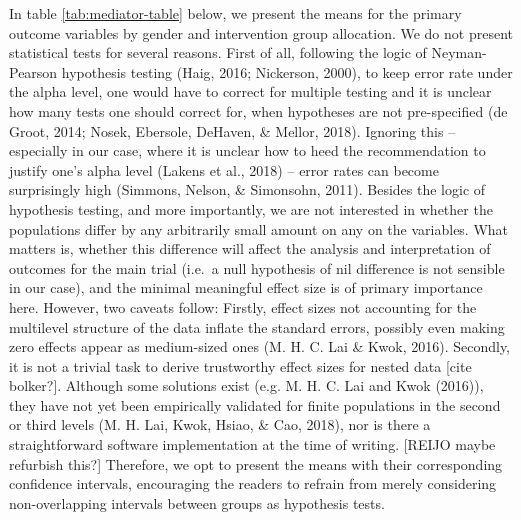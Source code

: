 \documentclass[english,floatsintext,]{apa6}
\theoremstyle{definition}
\theoremstyle{definition}
\theoremstyle{definition}
\theoremstyle{remark}
\begin{document}
In table \ref{tab:mediator-table} below, we present the means for the
primary outcome variables by gender and intervention group allocation.
We do not present statistical tests for several reasons. First of all,
following the logic of Neyman-Pearson hypothesis testing (Haig, 2016;
Nickerson, 2000), to keep error rate under the alpha level, one would
have to correct for multiple testing and it is unclear how many tests
one should correct for, when hypotheses are not pre-specified (de Groot,
2014; Nosek, Ebersole, DeHaven, \& Mellor, 2018). Ignoring this --
especially in our case, where it is unclear how to heed the
recommendation to justify one's alpha level (Lakens et al., 2018) --
error rates can become surprisingly high (Simmons, Nelson, \& Simonsohn,
2011). Besides the logic of hypothesis testing, and more importantly, we
are not interested in whether the populations differ by any arbitrarily
small amount on any on the variables. What matters is, whether this
difference will affect the analysis and interpretation of outcomes for
the main trial (i.e.~a null hypothesis of nil difference is not sensible
in our case), and the minimal meaningful effect size is of primary
importance here. However, two caveats follow: Firstly, effect sizes not
accounting for the multilevel structure of the data inflate the standard
errors, possibly even making zero effects appear as medium-sized ones
(M. H. C. Lai \& Kwok, 2016). Secondly, it is not a trivial task to
derive trustworthy effect sizes for nested data {[}cite bolker?{]}.
Although some solutions exist (e.g. M. H. C. Lai and Kwok (2016)), they
have not yet been empirically validated for finite populations in the
second or third levels (M. H. Lai, Kwok, Hsiao, \& Cao, 2018), nor is
there a straightforward software implementation at the time of writing.
{[}REIJO maybe refurbish this?{]} Therefore, we opt to present the means
with their corresponding confidence intervals, encouraging the readers
to refrain from merely considering non-overlapping intervals between
groups as hypothesis tests.
\end{document}
